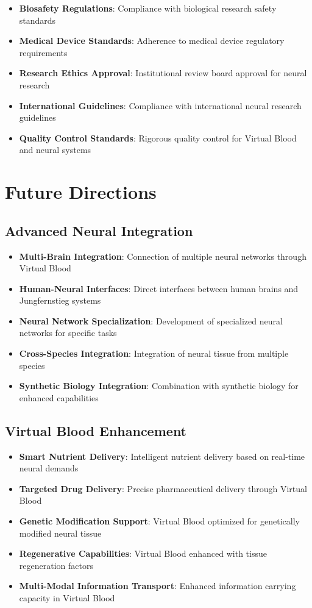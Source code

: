 \documentclass[12pt,a4paper]{article}
\begin{document}
\begin{itemize}
\item \textbf{Biosafety Regulations}: Compliance with biological research safety standards
\item \textbf{Medical Device Standards}: Adherence to medical device regulatory requirements
\item \textbf{Research Ethics Approval}: Institutional review board approval for neural research
\item \textbf{International Guidelines}: Compliance with international neural research guidelines
\item \textbf{Quality Control Standards}: Rigorous quality control for Virtual Blood and neural systems
\end{itemize}

\section{Future Directions}

\subsection{Advanced Neural Integration}

\begin{itemize}
\item \textbf{Multi-Brain Integration}: Connection of multiple neural networks through Virtual Blood
\item \textbf{Human-Neural Interfaces}: Direct interfaces between human brains and Jungfernstieg systems
\item \textbf{Neural Network Specialization}: Development of specialized neural networks for specific tasks
\item \textbf{Cross-Species Integration}: Integration of neural tissue from multiple species
\item \textbf{Synthetic Biology Integration}: Combination with synthetic biology for enhanced capabilities
\end{itemize}

\subsection{Virtual Blood Enhancement}

\begin{itemize}
\item \textbf{Smart Nutrient Delivery}: Intelligent nutrient delivery based on real-time neural demands
\item \textbf{Targeted Drug Delivery}: Precise pharmaceutical delivery through Virtual Blood
\item \textbf{Genetic Modification Support}: Virtual Blood optimized for genetically modified neural tissue
\item \textbf{Regenerative Capabilities}: Virtual Blood enhanced with tissue regeneration factors
\item \textbf{Multi-Modal Information Transport}: Enhanced information carrying capacity in Virtual Blood
\end{itemize}
\end{document}
